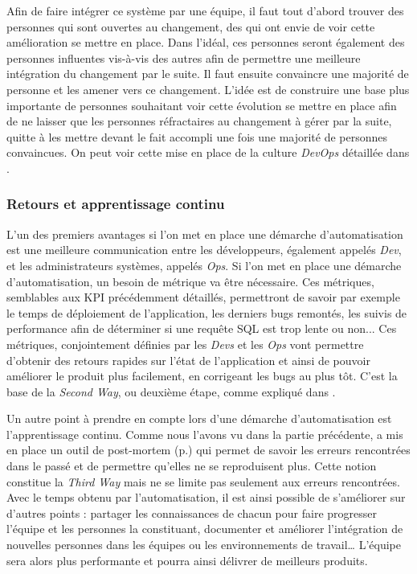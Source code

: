 Afin de faire intégrer ce système par une équipe, il faut tout d'abord trouver des personnes qui sont ouvertes au changement, des  qui ont envie de voir cette amélioration se mettre en place. Dans l'idéal, ces personnes seront également des personnes influentes vis-à-vis des autres afin de permettre une meilleure intégration du changement par le suite. Il faut ensuite convaincre une majorité de personne et les amener vers ce changement. L'idée est de construire une base plus importante de personnes souhaitant voir cette évolution se mettre en place afin de ne laisser que les personnes réfractaires au changement à gérer par la suite, quitte à les mettre devant le fait accompli une fois une majorité de personnes convaincues. On peut voir cette mise en place de la culture \emph{DevOps} détaillée dans  \cite[p.58-59]{devOpsHandbook}.

\subsubsection{Retours et apprentissage continu}

L'un des premiers avantages si l'on met en place une démarche d'automatisation est une meilleure communication entre les développeurs, également appelés \emph{Dev}, et les administrateurs systèmes, appelés \emph{Ops}. Si l'on met en place une démarche d'automatisation, un besoin de métrique va être nécessaire. Ces métriques, semblables aux \gls{KPI} précédemment détaillés, permettront de savoir par exemple le temps de déploiement de l'application, les derniers bugs remontés, les suivis de performance afin de déterminer si une requête \gls{SQL} est trop lente ou non... Ces métriques, conjointement définies par les \emph{Devs} et les \emph{Ops} vont permettre d'obtenir des retours rapides sur l'état de l'application et ainsi de pouvoir améliorer le produit plus facilement, en corrigeant les bugs au plus tôt. C'est la base de la \emph{Second Way}, ou deuxième étape, comme expliqué dans  \cite[p.405-410]{phoenixProject}.

Un autre point à prendre en compte lors d'une démarche d'automatisation est l'apprentissage continu. Comme nous l'avons vu dans la partie précédente, \etsy{} a mis en place un outil de post-mortem (p.\pageref{post-mortem}) qui permet de savoir les erreurs rencontrées dans le passé et de permettre qu'elles ne se reproduisent plus. Cette notion constitue la \emph{Third Way} mais ne se limite pas seulement aux erreurs rencontrées. Avec le temps obtenu par l'automatisation, il est ainsi possible de s'améliorer sur d'autres points : partager les connaissances de chacun pour faire progresser l'équipe et les personnes la constituant, documenter et améliorer l'intégration de nouvelles personnes dans les équipes ou les environnements de travail\ldots{} L'équipe sera alors plus performante et pourra ainsi délivrer de meilleurs produits.

